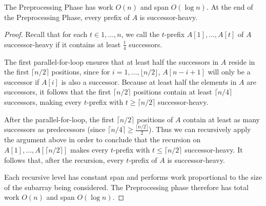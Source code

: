 \documentclass[twoside,leqno,twocolumn]{article}
\begin{document}
\begin{lemma}
 The Preprocessing Phase has work $O(n)$ and span $O(\log n)$. At the
 end of the Preprocessing Phase, every prefix of $A$ is
 successor-heavy.
  \label{lem:preprocessingphase}
\end{lemma}
\begin{proof}
Recall that for each $t \in 1, \ldots, n$, we call the $t$-prefix
$A[1], \ldots, A[t]$ of $A$ successor-heavy if it contains at least
$\frac{t}{4}$ successors.

The first parallel-for-loop ensures that at least half the successors
in $A$ reside in the first $\lceil n / 2 \rceil$ positions, since for
$i = 1, \ldots, \lfloor n / 2 \rfloor$, $A[n - i + 1]$ will only be a
successor if $A[i]$ is also a successor. Because at least half the
elements in $A$ are successors, it follows that the first $\lceil n /
2 \rceil$ positions contain at least $\lceil n / 4\rceil$ successors,
making every $t$-prefix with $t \ge \lceil n / 2 \rceil$
successor-heavy.

After the parallel-for-loop, the first $\lceil n / 2 \rceil$ positions
of $A$ contain at least as many successors as predecessors (since
$\lceil n / 4 \rceil \ge \frac{\lceil n / 2 \rceil}{2}$). Thus we can
recursively apply the argument above in order to conclude that the
recursion on $A[1], \ldots, A[\lceil n / 2 \rceil]$ makes every
$t$-prefix with $t \le \lceil n / 2 \rceil$ successor-heavy. It
follows that, after the recursion, every $t$-prefix of $A$ is
successor-heavy.

Each recursive level has constant span and performs work proportional
to the size of the subarray being considered. The Preprocessing phase
therefore has total work $O(n)$ and span $O(\log n)$.
\end{proof}




\end{document}
